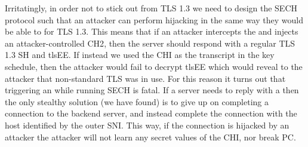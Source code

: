 Irritatingly, in order not to stick out from \ac{TLS} 1.3
we need to design the \ac{SECH} protocol such that an attacker
can perform  hijacking  in the same way
they would be able to for \ac{TLS} 1.3.
This means that if an attacker intercepts the 
and injects an attacker-controlled \ac{CH2},
then the server should respond with a regular \ac{TLS} 1.3
\ac{SH} and \ac{tlsEE}.
If instead we used the \ac{CHI} as the transcript
in the key schedule,
then the attacker would
fail to decrypt \ac{tlsEE} which would
reveal to the attacker that non-standard \ac{TLS} was in use.
For this reason it turns out that triggering an 
while running \ac{SECH} is fatal.
If a server needs to reply with a  then the only
stealthy solution (we have found)
is to give up on completing a connection
to the backend server, and instead complete
the connection with the host identified by the outer \ac{SNI}.
This way, if the connection is hijacked by an attacker
the attacker will not learn any secret values of the \ac{CHI}, nor break \ac{PC}.